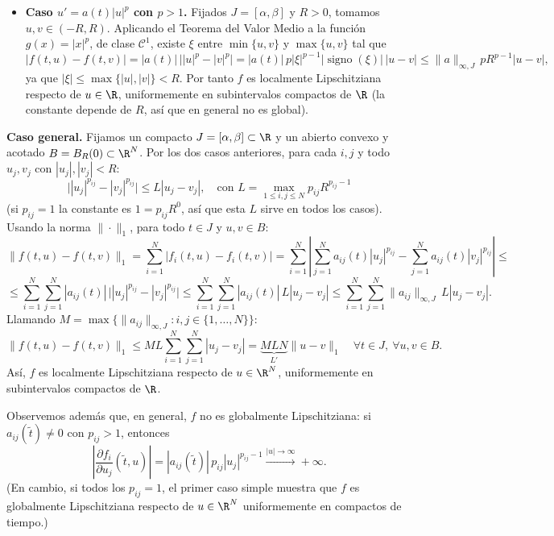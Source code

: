 {\begin{itemize}
        \item \textbf{Caso $u' = a(t)|u|^p$ con $p > 1$.} Fijados $J = [\alpha, \beta]$ y $R > 0$, tomamos $u, v \in (-R, R)$. Aplicando el Teorema del Valor Medio a la función $g(x) = |x|^p$, de clase $\mathcal{C}^1$, existe $\xi$ entre $\min\{u,v\}$ y $\max\{u,v\}$ tal que
        \[
            |f(t,u) - f(t,v)| = |a(t)| \, \big| |u|^p - |v|^p \big| = |a(t)| \, p |\xi|^{p-1} |\operatorname{signo}(\xi)| \, |u - v| \le \|a\|_{\infty, J} \, p R^{p-1} |u - v|,
        \]
        ya que $|\xi| \le \max\{|u|, |v|\} < R$. Por tanto $f$ es localmente Lipschitziana respecto de $u \in \R$, uniformemente en subintervalos compactos de $\R$ (la constante depende de $R$, así que en general no es global).
    \end{itemize}

    \textbf{Caso general.} Fijamos un compacto $J = [\alpha, \beta] \subset \R$ y un abierto convexo y acotado $B = B_R(0) \subset \R^N$. Por los dos casos anteriores, para cada $i,j$ y todo $u_j, v_j$ con $|u_j|, |v_j| < R$:
    \[
        \big| |u_j|^{p_{ij}} - |v_j|^{p_{ij}} \big| \le L |u_j - v_j|, \quad \text{con } L = \max_{1 \le i,j \le N} p_{ij} R^{p_{ij}-1}
    \]
    (si $p_{ij} = 1$ la constante es $1 = p_{ij} R^{0}$, así que esta $L$ sirve en todos los casos). Usando la norma $\|\cdot\|_1$, para todo $t \in J$ y $u, v \in B$:
    \[
        \|f(t,u) - f(t,v)\|_1 = \sum_{i=1}^N |f_i(t,u) - f_i(t,v)| = \sum_{i=1}^N \left| \sum_{j=1}^N a_{ij}(t)|u_j|^{p_{ij}} - \sum_{j=1}^N a_{ij}(t)|v_j|^{p_{ij}} \right| \le
    \]
    \[
        \le \sum_{i=1}^N \sum_{j=1}^N |a_{ij}(t)| \, \big| |u_j|^{p_{ij}} - |v_j|^{p_{ij}} \big| \le \sum_{i=1}^N \sum_{j=1}^N |a_{ij}(t)| \, L |u_j - v_j| \le \sum_{i=1}^N \sum_{j=1}^N \|a_{ij}\|_{\infty, J} \, L |u_j - v_j|.
    \]
    Llamando $M = \max\{ \|a_{ij}\|_{\infty, J} : i,j \in \{1, \dots, N\} \}$:
    \[
        \|f(t,u) - f(t,v)\|_1 \le M L \sum_{i=1}^N \sum_{j=1}^N |u_j - v_j| = \underbrace{M L N}_{L'} \|u - v\|_1 \quad \forall t \in J, \ \forall u, v \in B.
    \]
    Así, $f$ es localmente Lipschitziana respecto de $u \in \R^N$, uniformemente en subintervalos compactos de $\R$.

    Observemos además que, en general, $f$ no es globalmente Lipschitziana: si $a_{ij}(\tilde{t}) \neq 0$ con $p_{ij} > 1$, entonces
    \[
        \left| \frac{\partial f_i}{\partial u_j}(\tilde{t}, u) \right| = |a_{ij}(\tilde{t})| \, p_{ij} |u_j|^{p_{ij}-1} \xrightarrow{|u| \to \infty} +\infty.
    \]
    (En cambio, si todos los $p_{ij} = 1$, el primer caso simple muestra que $f$ es globalmente Lipschitziana respecto de $u \in \R^N$ uniformemente en compactos de tiempo.)

}
